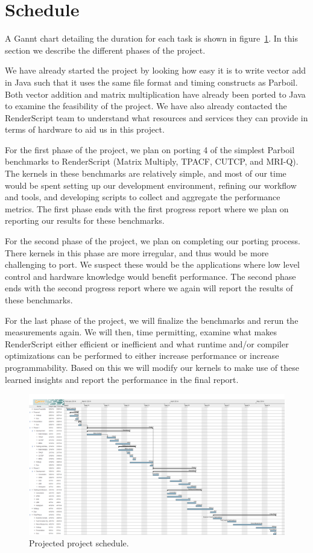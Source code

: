 
\section*{Schedule}

A Gannt chart detailing the duration for each task
  is shown in figure~\ref{fig:schedule}.
In this section we describe the different phases
    of the project.

We have already started the project by looking how
  easy it is to write vector add in Java such that
  it uses the same file format and timing constructs
  as Parboil.
Both vector addition and matrix multiplication have
  already been ported to Java to examine the feasibility
  of the project.
We have also already contacted the RenderScript team
  to understand what resources and services they can
  provide in terms of hardware to aid us in this project.

For the first phase of the project, we plan on porting
  4 of the simplest Parboil benchmarks to RenderScript
  (Matrix Multiply, TPACF, CUTCP, and MRI-Q).
The kernels in these benchmarks are relatively simple, 
  and most of our time would be spent setting up our 
  development environment, refining our workflow and tools, 
  and developing scripts to collect and aggregate the
  performance metrics.
The first phase ends with the first progress report where
    we plan on reporting our results for these benchmarks.


For the second phase of the project, we plan on completing
    our porting process.
There kernels in this phase are more irregular, and thus
    would be more challenging to port.
We suspect these would be the applications where low level
    control and hardware knowledge would benefit performance.
The second phase ends with the second progress report where
    we again will report the results of these benchmarks.


For the last phase of the project, we will finalize the 
    benchmarks and rerun the measurements again.
We will then, time permitting, examine what makes RenderScript
    either efficient or inefficient and what runtime and/or
    compiler optimizations can be performed to either 
    increase performance or increase programmability.
Based on this we will modify our kernels to make use of these
    learned insights and report the performance in the final
    report.

\begin{figure}[t!]
\includegraphics[scale=0.18, angle=90]{chart.png}
\caption{Projected project schedule.}
\label{fig:schedule}
\centering
\end{figure}
